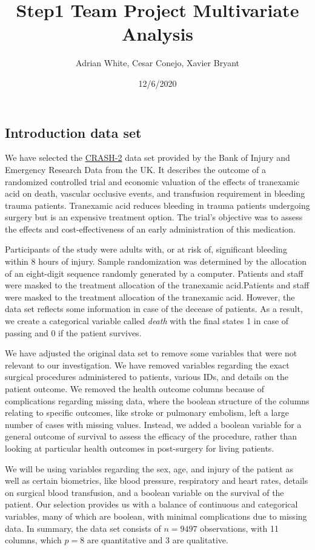 \documentclass[
]{article}
\title{Step1 Team Project Multivariate Analysis}
\author{Adrian White, Cesar Conejo, Xavier Bryant}
\date{12/6/2020}
\begin{document}
\maketitle

\hypertarget{introduction-data-set}{%
\subsection{Introduction data set}\label{introduction-data-set}}

We have selected the
\href{https://hbiostat.org/data/repo/crash2.html}{CRASH-2} data set
provided by the Bank of Injury and Emergency Research Data from the UK.
It describes the outcome of a randomized controlled trial and economic
valuation of the effects of tranexamic acid on death, vascular occlusive
events, and transfusion requirement in bleeding trauma patients.
Tranexamic acid reduces bleeding in trauma patients undergoing surgery
but is an expensive treatment option. The trial's objective was to
assess the effects and cost-effectiveness of an early administration of
this medication.

Participants of the study were adults with, or at risk of, significant
bleeding within 8 hours of injury. Sample randomization was determined
by the allocation of an eight-digit sequence randomly generated by a
computer. Patients and staff were masked to the treatment allocation of
the tranexamic acid.Patients and staff were masked to the treatment
allocation of the tranexamic acid. However, the data set reflects some
information in case of the decease of patients. As a result, we create a
categorical variable called \emph{death} with the final states 1 in case
of passing and 0 if the patient survives.

We have adjusted the original data set to remove some variables that
were not relevant to our investigation. We have removed variables
regarding the exact surgical procedures administered to patients,
various IDs, and details on the patient outcome. We removed the health
outcome columns because of complications regarding missing data, where
the boolean structure of the columns relating to specific outcomes, like
stroke or pulmonary embolism, left a large number of cases with missing
values. Instead, we added a boolean variable for a general outcome of
survival to assess the efficacy of the procedure, rather than looking at
particular health outcomes in post-surgery for living patients.

We will be using variables regarding the sex, age, and injury of the
patient as well as certain biometrics, like blood pressure, respiratory
and heart rates, details on surgical blood transfusion, and a boolean
variable on the survival of the patient. Our selection provides us with
a balance of continuous and categorical variables, many of which are
boolean, with minimal complications due to missing data. In summary, the
data set consists of \(n = 9497\) observations, with 11 columns, which
\(p = 8\) are quantitative and 3 are qualitative.
\end{document}
